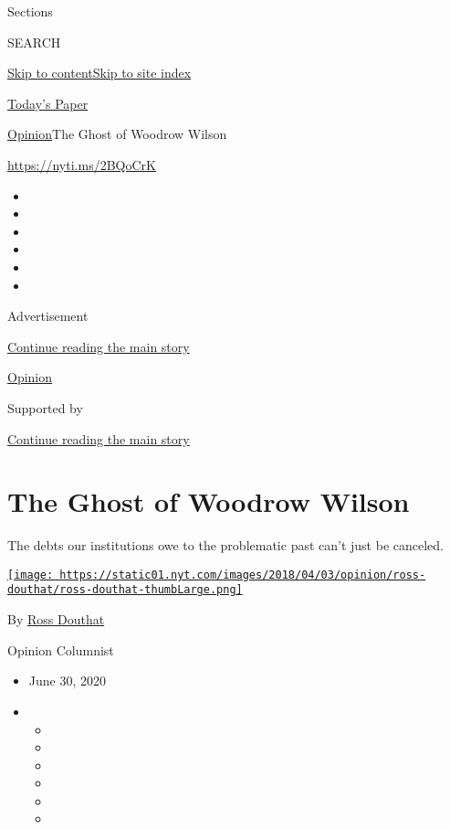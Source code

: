 Sections

SEARCH

\protect\hyperlink{site-content}{Skip to
content}\protect\hyperlink{site-index}{Skip to site index}

\href{https://myaccount.nytimes.com/auth/login?response_type=cookie\&client_id=vi}{}

\href{https://www.nytimes.com/section/todayspaper}{Today's Paper}

\href{/section/opinion}{Opinion}\textbar{}The Ghost of Woodrow Wilson

\href{https://nyti.ms/2BQoCrK}{https://nyti.ms/2BQoCrK}

\begin{itemize}
\item
\item
\item
\item
\item
\item
\end{itemize}

Advertisement

\protect\hyperlink{after-top}{Continue reading the main story}

\href{/section/opinion}{Opinion}

Supported by

\protect\hyperlink{after-sponsor}{Continue reading the main story}

\hypertarget{the-ghost-of-woodrow-wilson}{%
\section{The Ghost of Woodrow
Wilson}\label{the-ghost-of-woodrow-wilson}}

The debts our institutions owe to the problematic past can't just be
canceled.

\href{https://www.nytimes.com/by/ross-douthat}{\texttt{[image: https://static01.nyt.com/images/2018/04/03/opinion/ross-douthat/ross-douthat-thumbLarge.png]}}

By \href{https://www.nytimes.com/by/ross-douthat}{Ross Douthat}

Opinion Columnist

\begin{itemize}
\item
  June 30, 2020
\item
  \begin{itemize}
  \item
  \item
  \item
  \item
  \item
  \item
  \end{itemize}
\end{itemize}

